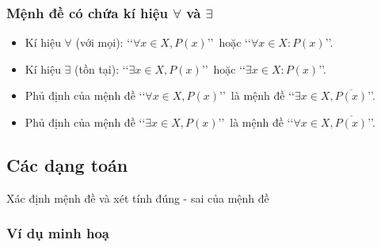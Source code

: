 \begin{tomtat}
\subsubsection{Mệnh đề có chứa kí hiệu $\forall$ và $\exists$}

\begin{itemize}
	\item Kí hiệu $\forall$ (với mọi): \lq\lq $ \forall x \in X, P(x)$\rq\rq\ hoặc \lq\lq $ \forall x \in X : P(x)$\rq\rq.
	\item Kí hiệu $\exists$ (tồn tại): \lq\lq $ \exists x \in X, P(x)$\rq\rq\ hoặc \lq\lq $ \exists x \in X : P(x)$\rq\rq.
\end{itemize}

\begin{note}\hfil
	\begin{itemize}
		\item Phủ định của mệnh đề \lq\lq $ \forall x \in X, P(x)$\rq\rq\ là mệnh đề \lq\lq $ \exists x\in X, \overline{P(x)}$\rq\rq.
		\item Phủ định của mệnh đề \lq\lq $ \exists x\in X, P(x)$\rq\rq\ là mệnh đề  \lq\lq $ \forall x\in X, \overline{P(x)}$\rq\rq.
	\end{itemize}
\end{note}

\end{tomtat}


\subsection{Các dạng toán}

\begin{dang}{Xác định mệnh đề và xét tính đúng - sai của mệnh đề}
\end{dang}

\subsubsection{Ví dụ minh hoạ}

